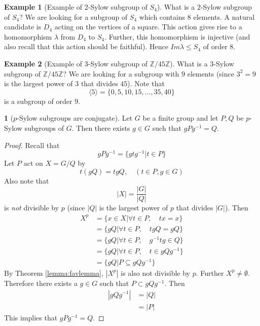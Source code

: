 \documentclass[12pt]{article}
\theoremstyle{definition}
\newtheorem{theorem}{\color{ForestGreen}{\textbf{Theorem}}}
\newcommand{\Z}{\mathbb{Z}}
\newtheorem{example}{\color{WildStrawberry}Example}
\theoremstyle{definition}
\begin{document}
\begin{example}[Example of 2-Sylow subgroup of $S_4$]
	What is a $2$-Sylow subgroup of $S_4$? We are looking for a subgroup of $S_4$ which contains $8$ elements. A natural candidate is $D_4$ acting on the vertices of a square. This action gives rise to a homomorphism $\lambda$ from $D_4$ to $S_4$. Further, this homomorphism is injective (and also recall that this action should be faithful). Hence $Im \lambda \leq S_4$ of order $8$.
\end{example}

\begin{example}[Example of 3-Sylow subgroup of $\Z/45\Z$]
	What is a $3$-Sylow subgroup of $\Z/45\Z$? We are looking for a subgroup with $9$ elements (since $3^2 = 9$ is the largest power of $3$ that divides $45$). Note that
	\begin{equation}
		\langle 5 \rangle = \{0,5,10,15,\ldots,35,40\}
	\end{equation}
	is a subgroup of order $9$.
\end{example}

\begin{theorem}[$p$-Sylow subgroups are conjugate]
	Let $G$ be a finite group and let $P,Q$ be $p$-Sylow subgroups of $G$. Then there exists $g \in G$ such that $gPg^{-1} = Q$. 
\end{theorem}
\begin{proof}
	Recall that 
	\begin{equation}
		gPg^{-1} = \{gtg^{-1} |t \in P\}
	\end{equation}
	Let $P$ act on $X = G/Q$ by 
	\begin{equation}
		t(gQ) = tgQ, \quad (t \in P, g \in G)
	\end{equation}
	Also note that
	\begin{equation}
		|X| = \frac{|G|}{|Q|}
	\end{equation}
	is \emph{not} divisible by $p$ (since $|Q|$ is the largest power of $p$ that divides $|G|$). Then
	\begin{align*}
		X^p &= \{x \in X | \forall t \in P, \quad tx = x\} \\
		&= \{gQ | \forall t \in P, \quad tgQ= gQ\} \\
		&= \{gQ | \forall t \in P, \quad g^{-1}tg \in Q\} \\
		&= \{gQ | \forall t \in P, \quad t \in gQg^{-1}\} \\
		&= \{gQ | P \subseteq gQg^{-1}\}
	\end{align*} 
	By Theorem \ref{lemma:favlemma}, $|X^p|$ is also not divisible by $p$. Further $X^p \neq \emptyset$. Therefore there exists a $g \in G$ such that $P \subset gQg^{-1}$. Then
	\begin{align*}
		|gQg^{-1}| &= |Q| \tag{conjugation is a bijective operation} \\
		&= |P| \tag{since both $p$-Sylow subgroups}
	\end{align*}
	This implies that $gPg^{-1} = Q$. 
\end{proof}
\end{document}
